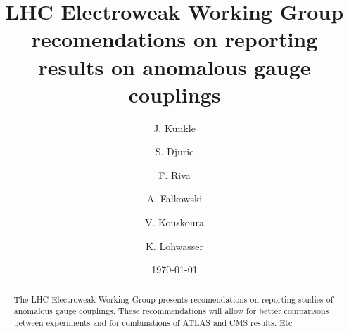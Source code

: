 \documentclass[aps,prl,preprint,groupedaddress]{revtex4-1}
\begin{document}
\title{LHC Electroweak Working Group recomendations on reporting results on anomalous gauge couplings}


\author{J. Kunkle}
\author{S. Djuric}
\affiliation{}
\author{F. Riva}
\affiliation{}
\author{A. Falkowski}
\affiliation{}
\author{V. Kouskoura}
\affiliation{}
\author{K. Lohwasser}
\affiliation{}



\date{\today}

\begin{abstract}
The LHC Electroweak Working Group presents recomendations on 
reporting studies of anomalous gauge couplings.  
These recommendations will allow for better comparisons
between experiments and for combinations of ATLAS and CMS results.
Etc

\end{abstract}

\pacs{}

\maketitle
















\end{document}
